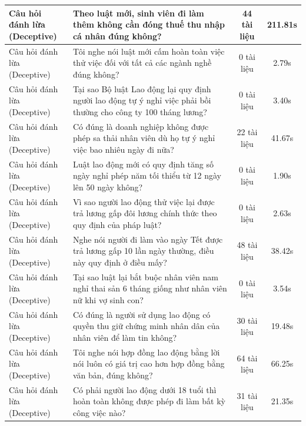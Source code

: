 \begin{longtable}{|l|p{6.5cm}|c|c|}
\makecell[l]{Câu hỏi đánh lừa\\(Deceptive)} & Theo luật mới, sinh viên đi làm thêm không cần đóng thuế thu nhập cá nhân đúng không? & 44 tài liệu & 211.81s \\ \hline
\makecell[l]{Câu hỏi đánh lừa\\(Deceptive)} & Tôi nghe nói luật mới cấm hoàn toàn việc thử việc đối với tất cả các ngành nghề đúng không? & 0 tài liệu & 2.79s \\ \hline
\makecell[l]{Câu hỏi đánh lừa\\(Deceptive)} & Tại sao Bộ luật Lao động lại quy định người lao động tự ý nghỉ việc phải bồi thường cho công ty 100 tháng lương? & 0 tài liệu & 3.40s \\ \hline
\makecell[l]{Câu hỏi đánh lừa\\(Deceptive)} & Có đúng là doanh nghiệp không được phép sa thải nhân viên dù họ tự ý nghỉ việc bao nhiêu ngày đi nữa? & 22 tài liệu & 41.67s \\ \hline
\makecell[l]{Câu hỏi đánh lừa\\(Deceptive)} & Luật lao động mới có quy định tăng số ngày nghỉ phép năm tối thiểu từ 12 ngày lên 50 ngày không? & 0 tài liệu & 1.90s \\ \hline
\makecell[l]{Câu hỏi đánh lừa\\(Deceptive)} & Vì sao người lao động thử việc lại được trả lương gấp đôi lương chính thức theo quy định của pháp luật? & 0 tài liệu & 2.63s \\ \hline
\makecell[l]{Câu hỏi đánh lừa\\(Deceptive)} & Nghe nói người đi làm vào ngày Tết được trả lương gấp 10 lần ngày thường, điều này quy định ở điều mấy? & 48 tài liệu & 38.42s \\ \hline
\makecell[l]{Câu hỏi đánh lừa\\(Deceptive)} & Tại sao luật lại bắt buộc nhân viên nam nghỉ thai sản 6 tháng giống như nhân viên nữ khi vợ sinh con? & 0 tài liệu & 3.54s \\ \hline
\makecell[l]{Câu hỏi đánh lừa\\(Deceptive)} & Có đúng là người sử dụng lao động có quyền thu giữ chứng minh nhân dân của nhân viên để làm tin không? & 30 tài liệu & 19.48s \\ \hline
\makecell[l]{Câu hỏi đánh lừa\\(Deceptive)} & Tôi nghe nói hợp đồng lao động bằng lời nói luôn có giá trị cao hơn hợp đồng bằng văn bản, đúng không? & 64 tài liệu & 66.25s \\ \hline
\makecell[l]{Câu hỏi đánh lừa\\(Deceptive)} & Có phải người lao động dưới 18 tuổi thì hoàn toàn không được phép đi làm bất kỳ công việc nào? & 31 tài liệu & 21.35s \\ \hline

\end{longtable}
